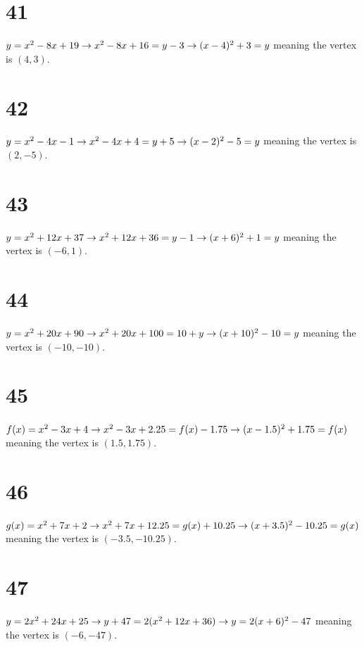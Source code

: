\documentclass{article}
\theoremstyle{definition}
\begin{document}
\section*{41}
$y=x^2-8x+19\newline\rightarrow x^2-8x+16=y-3\newline\rightarrow (x-4)^2+3=y$ meaning the vertex is $(4,3)$.

\section*{42}
$y=x^2-4x-1\newline\rightarrow x^2-4x+4=y+5\newline\rightarrow (x-2)^2-5=y$ meaning the vertex is $(2,-5)$.

\section*{43}
$y=x^2+12x+37\newline\rightarrow x^2+12x+36=y-1\newline\rightarrow (x+6)^2+1=y$ meaning the vertex is $(-6,1)$.

\section*{44}
$y=x^2+20x+90\newline\rightarrow x^2+20x+100=10+y\newline\rightarrow (x+10)^2-10=y$ meaning the vertex is $(-10,-10)$.

\section*{45}
$f(x)=x^2-3x+4\newline\rightarrow x^2-3x+2.25=f(x)-1.75\newline\rightarrow (x-1.5)^2+1.75=f(x)$ meaning the vertex is $(1.5,1.75)$.

\section*{46}
$g(x)=x^2+7x+2\newline\rightarrow x^2+7x+12.25=g(x)+10.25\newline\rightarrow (x+3.5)^2-10.25=g(x)$ meaning the vertex is $(-3.5,-10.25)$.

\section*{47}
$y=2x^2+24x+25\newline\rightarrow y+47=2(x^2+12x+36)\newline\rightarrow y=2(x+6)^2-47$ meaning the vertex is $(-6,-47)$.
\end{document}
